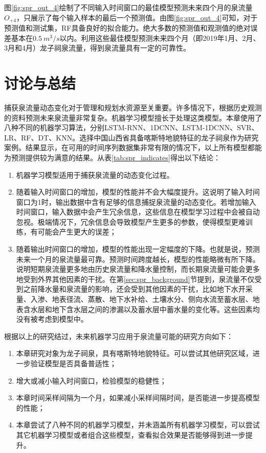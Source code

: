 图\ref{fig:spr_out_4}绘制了不同输入时间窗口的最佳模型预测未来四个月的泉流量$O_{+4}$，只展示了每个输入样本的最后一个预测值。由图\ref{fig:spr_out_4}可知，对于预测值和测试集，RF具备良好的拟合能力。绝大多数的预测值和观测值的绝对误差基本在$\SI{0.5}{m^{3}/s}$以内。利用这些最佳模型预测未来四个月（即2019年1月、2月、3月和4月）龙子祠泉流量，得到泉流量具有一定的可靠性。

\section{讨论与总结}\label{sec:spr_conclusion}

捕获泉流量动态变化对于管理和规划水资源至关重要。许多情况下，根据历史观测的资料预测未来泉流量非常复杂。机器学习模型擅长于处理这类模型。本章使用了八种不同的机器学习算法，分别LSTM-RNN、1DCNN、LSTM-1DCNN、SVR、LR、RF、DT、KNN。选择中国山西省具备喀斯特地貌特征的龙子祠泉作为研究案例。结果显示，在可用的时间序列数据集非常有限的情况下，以上所有模型都能为预测提供较为满意的结果。从表\ref{tab:spr_indicates}得出以下结论：
\begin{enumerate}
  \item 机器学习模型适用于捕获泉流量的动态变化过程。
  \item 随着输入时间窗口的增加，模型的性能并不会大幅度提升。这说明了输入时间窗口为1时，输出数据中含有足够的信息捕捉泉流量的动态变化。若增加输入时间窗口，输入数据中会产生冗余信息，这些信息在模型学习过程中会被自动忽视。极端情况下，冗余信息会导致模型产生更多的参数，使得模型更难训练，有可能会产生更大的误差；
  \item 随着输出时间窗口的增加，模型的性能出现一定幅度的下降。也就是说，预测未来一个月的泉流量最可靠。预测时间跨度越长，模型的性能略微有所下降。说明短期泉流量更多地由历史泉流量和降水量控制，而长期泉流量可能会更多地受到外界其他因素的干扰。在第\ref{sec:spr_background}节提到，泉流量不仅受到之前降水量和泉流量的影响，还会受到其他因素的干扰，比如地下水开采量、入渗、地表径流、蒸散、地下水补给、土壤水分、侧向水流至蓄水层、地表含水层和地下含水层之间的渗漏以及蓄水层中蓄水量的变化等。这些因素均没有被考虑到模型中。
\end{enumerate}

根据以上的研究结过，未来机器学习应用于泉流量可能的研究方向如下：
\begin{enumerate}
  \item 本章研究对象为龙子祠泉，具有喀斯特地貌特征。可以尝试其他研究区域，进一步验证模型是否具备普适性；
  \item 增大或减小输入时间窗口，检验模型的稳健性；
  \item 本章时间采样间隔为一个月，如果减小采样间隔时间，是否能进一步提高模型的性能；
  \item 本章尝试了八种不同的机器学习模型，并未涵盖所有机器学习模型，可以尝试其它机器学习模型或者组合这些模型，查看拟合效果是否能够得到进一步提升。
\end{enumerate}



